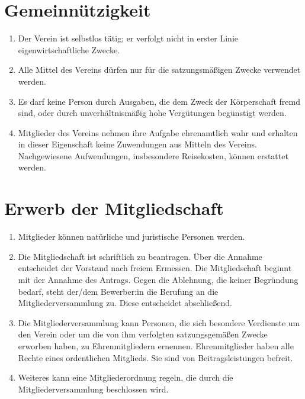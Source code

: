 \documentclass[12pt]{article}
\begin{document}
\section{Gemeinnützigkeit}
\begin{enumerate}[label=(\arabic*)]
	\item Der Verein ist selbstlos tätig; er verfolgt nicht in erster Linie eigenwirtschaftliche Zwecke.
	\item Alle Mittel des Vereins dürfen nur für die satzungsmäßigen Zwecke verwendet werden.
	\item Es darf keine Person durch Ausgaben, die dem Zweck der Körperschaft fremd sind, oder durch
	      unverhältnismäßig hohe Vergütungen begünstigt werden.
	\item Mitglieder des Vereins nehmen ihre Aufgabe ehrenamtlich wahr und erhalten in dieser
	      Eigenschaft keine Zuwendungen aus Mitteln des Vereins. Nachgewiesene Aufwendungen,
	      insbesondere Reisekosten, können erstattet werden.
\end{enumerate}

\section{Erwerb der Mitgliedschaft}
\begin{enumerate}[label=(\arabic*)]
	\item Mitglieder können natürliche und juristische Personen werden.
	\item Die Mitgliedschaft ist schriftlich zu beantragen. Über die Annahme entscheidet der Vorstand nach
	      freiem Ermessen. Die Mitgliedschaft beginnt mit der Annahme des Antrags. Gegen die Ablehnung,
	      die keiner Begründung bedarf, steht der/dem Bewerber:in die Berufung an die
	      Mitgliederversammlung zu. Diese entscheidet abschließend.
	\item Die Mitgliederversammlung kann Personen, die sich besondere Verdienste um den Verein oder
	      um die von ihm verfolgten satzungsgemäßen Zwecke erworben haben, zu Ehrenmitgliedern
	      ernennen. Ehrenmitglieder haben alle Rechte eines ordentlichen Mitglieds. Sie sind von
	      Beitragsleistungen befreit.
	\item Weiteres kann eine Mitgliederordnung regeln, die durch die Mitgliederversammlung beschlossen
	      wird.
\end{enumerate}
\end{document}
